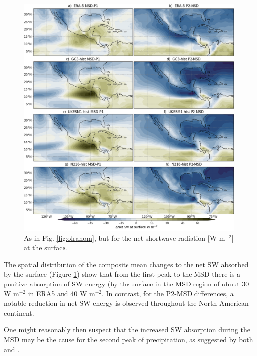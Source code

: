 \begin{figure}[t!]
\includegraphics[width=\linewidth]{figures/fig4_netswdif_3.png}
\caption[Composite shortave differences with MSD timings]{As in Fig. \ref{fig:olranom}, but for the  net shortwave radiation [W m$^{-2}$] at the surface.}
\label{fig:swnet_diff}
\end{figure}

The spatial distribution of the composite mean changes to the net SW absorbed by the surface (Figure \ref{fig:swnet_diff}) show that from the first peak to the MSD there is a positive absorption of SW energy (by the surface in the MSD region of about 30 W m$^{-2}$ in ERA5 and 40 W m$^{-2}$. In contrast, for the P2-MSD differences, a notable reduction in net SW energy is observed throughout the North American continent.

One might reasonably then suspect that the increased SW absorption during the MSD may be the cause for the second peak of precipitation, as suggested by both \cite{magana1999} and \cite{karnauskas2013}. 

